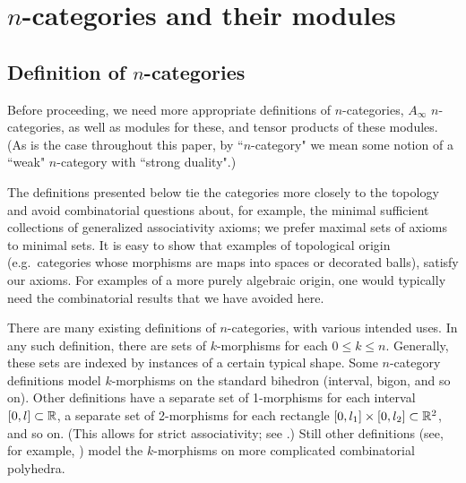 
\def\xxpar#1#2{\smallskip\noindent{\bf #1} {\it #2} \smallskip}
\def\mmpar#1#2#3{\smallskip\noindent{\bf #1} (#2). {\it #3} \smallskip}

\section{\texorpdfstring{$n$}{n}-categories and their modules}
\label{sec:ncats}

\subsection{Definition of \texorpdfstring{$n$}{n}-categories}
\label{ss:n-cat-def}

Before proceeding, we need more appropriate definitions of $n$-categories, 
$A_\infty$ $n$-categories, as well as modules for these, and tensor products of these modules.
(As is the case throughout this paper, by ``$n$-category" we mean some notion of
a ``weak" $n$-category with ``strong duality".)

The definitions presented below tie the categories more closely to the topology
and avoid combinatorial questions about, for example, the minimal sufficient
collections of generalized associativity axioms; we prefer maximal sets of axioms to minimal sets.
It is easy to show that examples of topological origin
(e.g.\ categories whose morphisms are maps into spaces or decorated balls), 
satisfy our axioms.
For examples of a more purely algebraic origin, one would typically need the combinatorial
results that we have avoided here.


\medskip

There are many existing definitions of $n$-categories, with various intended uses.
In any such definition, there are sets of $k$-morphisms for each $0 \leq k \leq n$.
Generally, these sets are indexed by instances of a certain typical shape. 
Some $n$-category definitions model $k$-morphisms on the standard bihedron (interval, bigon, and so on).
Other definitions have a separate set of 1-morphisms for each interval $[0,l] \subset \mathbb{R}$, 
a separate set of 2-morphisms for each rectangle $[0,l_1]\times [0,l_2] \subset \mathbb{R}^2$,
and so on.
(This allows for strict associativity; see \cite{ulrike-tillmann-2008,0909.2212}.)
Still other definitions (see, for example, \cite{MR2094071})
model the $k$-morphisms on more complicated combinatorial polyhedra.

